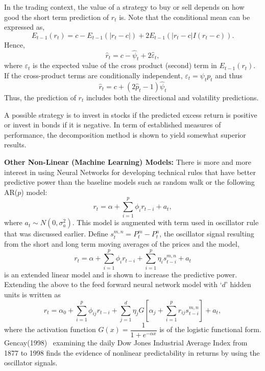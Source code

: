 In the trading context, the value of a strategy to buy or sell depends on how good the short term prediction of $r_{t}$ is. Note that the conditional mean can be expressed as,
	\[
	E_{t-1}(r_t) = c - E_{t-1}(\left| r_t - c \right|) + 2 E_{t-1}(\left| r_t - c \right| I(r_t - c)).
	\]
Hence,
	\begin{equation} \label{eqn:hatrt}
	\hat{r}_{t} = c - \hat{\psi}_{t} + 2 \hat{\varepsilon}_t,
	\end{equation}
where $\varepsilon_t$ is the expected value of the cross product (second) term in $E_{t-1}(r_t)$. If the cross-product terms are conditionally independent, $\varepsilon_t = \psi_t p_t$ and thus
	\begin{equation} \label{eqn:hatrt2}
	\hat{r}_t = c + (2\hat{p}_t - 1)\hat{\psi}_t
	\end{equation}
Thus, the prediction of $r_{t}$ includes both the directional and volatility predictions.


A possible strategy is to invest in stocks if the predicted excess return is positive or invest in bonds if it is negative. In term of established measures of performance, the decomposition method is shown to yield somewhat superior results. \twomedskip


\noindent\textbf{Other Non-Linear (Machine Learning) Models:} There is more and more interest in using Neural Networks for developing technical rules that have better predictive power than the baseline models such as random walk or the following AR($p$) model:
	\begin{equation} \label{eqn:ri}
	r_t = \alpha + \sum_{i=1}^p\phi_ir_{t-i} + a_t,
	\end{equation}
where $a_t \sim N(0, \sigma_a^2)$. This model is augmented with term used in oscillator rule that was discussed earlier. Define $s_t^{m,n} = P_t^m - P_t^n$, the oscillator signal resulting from the short and long term moving averages of the prices and the model,
	\begin{equation} \label{eqn:rtsum}
	r_t = \alpha + \sum_{i=1}^p\phi_ir_{t-i} + \sum_{i=1}^p\eta_is_{t-i}^{m,n}+ a_t
	\end{equation}
is an extended linear model and is shown to increase the predictive power. Extending the above to the feed forward neural network model with `$d$' hidden units is written as
	\begin{equation} \label{eqn:rtsum2}
	r_t = \alpha_0 + \sum_{i=1}^p \phi_{ij}r_{t-i} + \sum_{j=1}^d \eta_j G\left[\alpha_j + \sum_{i=1}^pr_{ij}s_{t-i}^{m,n} \right] + a_t,
	\end{equation}
where the activation function $G(x) = \dfrac{1}{1 + e^{-\alpha x}}$ is of the logistic functional form. Gencay(1998)~\cite{gencay} examining the daily Dow Jones Industrial Average Index from 1877 to 1998 finds the evidence of nonlinear predictability in returns by using the oscillator signals.


